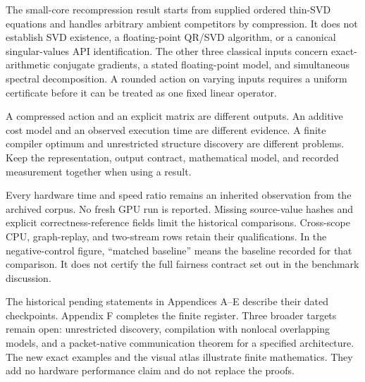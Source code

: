 \documentclass[11pt,letterpaper]{article}
\theoremstyle{definition}
\theoremstyle{remark}
\begin{document}
The small-core recompression result starts from supplied ordered thin-SVD equations and handles arbitrary ambient competitors by compression. It does not establish SVD existence, a floating-point QR/SVD algorithm, or a canonical singular-values API identification. The other three classical inputs concern exact-arithmetic conjugate gradients, a stated floating-point model, and simultaneous spectral decomposition. A rounded action on varying inputs requires a uniform certificate before it can be treated as one fixed linear operator.

\begin{keyidea}[title={Representation, output, model, observation}]
A compressed action and an explicit matrix are different outputs. An additive cost model and an observed execution time are different evidence. A finite compiler optimum and unrestricted structure discovery are different problems. Keep the representation, output contract, mathematical model, and recorded measurement together when using a result.
\end{keyidea}

Every hardware time and speed ratio remains an inherited observation from the archived corpus. No fresh GPU run is reported. Missing source-value hashes and explicit correctness-reference fields limit the historical comparisons. Cross-scope CPU, graph-replay, and two-stream rows retain their qualifications. In the negative-control figure, ``matched baseline'' means the baseline recorded for that comparison. It does not certify the full fairness contract set out in the benchmark discussion.

The historical pending statements in Appendices A--E describe their dated checkpoints. Appendix F completes the finite register. Three broader targets remain open: unrestricted discovery, compilation with nonlocal overlapping models, and a packet-native communication theorem for a specified architecture. The new exact examples and the visual atlas illustrate finite mathematics. They add no hardware performance claim and do not replace the proofs.
\clearpage
\tableofcontents
\clearpage
\listoffigures
\clearpage
{}
\end{document}
